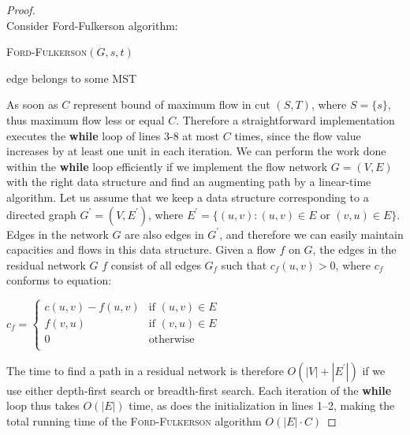 \documentclass{article}
\let\oldnl\nl
\newcommand{\nonl}{\renewcommand{\nl}{\let\nl\oldnl}}
\begin{document}
\begin{proof}

\cite[Analysis of Ford-Fulkerson algorithm][page 725]{introtoalg}\\

Consider Ford-Fulkerson algorithm:\\

\IncMargin{1em}
\begin{algorithm}[H]
  \SetAlgoNoEnd\SetAlgoNoLine
  \SetNlSkip{1.5em}
  \DontPrintSemicolon

  \nonl \textsc{Ford-Fulkerson}$(G,s,t)$\;

  \Return edge belongs to some MST\;
\end{algorithm}

\vspace{1em}

As soon as $C$ represent bound of maximum flow in cut $(S,T)$, where
$S=\{s\}$, thus maximum flow less or equal $C$. Therefore a straightforward
implementation executes the \textbf{while} loop of lines 3-8 at most $C$ times,
since the flow value increases by at least one unit in each iteration.
We can perform the work done within the \textbf{while} loop efficiently if we implement
the flow network $G=(V,E)$ with the right data structure and find an augmenting
path by a linear-time algorithm.
Let us assume that we keep a data structure corresponding to a directed graph
$G^\prime=(V,E^\prime)$, where $E^\prime=\{(u,v):(u,v) \in E \text{ or } (v,u)
\in E\}$. Edges in the network $G$ are also edges in $G^\prime$, and therefore we can
easily maintain capacities and flows in this data structure.
Given a flow $f$ on $G$,
the edges in the residual network $G$ $f$ consist of all edges $G_f$ such that
$c_f(u,v) > 0$, where $c_f$ conforms to equation:

$c_f = 
\begin{cases}
  c(u,v)-f(u,v) & \text{if } (u,v) \in E \\
  f(v,u)        & \text{if } (v,u) \in E \\
  0             & \text{otherwise} \\
\end{cases}
$

The time to find a path in a residual network is therefore $O(|V| + |E^\prime|)$
if we use either depth-first search or breadth-first search. Each iteration of
the \textbf{while} loop thus takes $O(|E|)$ time, as does the initialization in lines
1–2, making the total running time of the \textsc{Ford-Fulkerson} algorithm
$O(|E| \cdot C)$ 
\end{proof}
\end{document}
